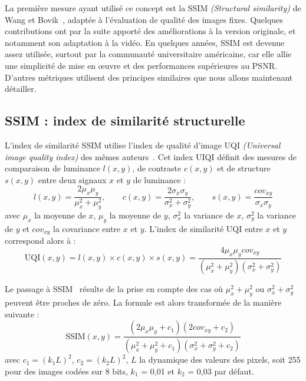 La première mesure ayant utilisé ce concept est la SSIM \emph{(Structural similarity)} de Wang et Bovik~\cite{wang-ssim}, adaptée à l'évaluation de qualité des images fixes. Quelques contributions ont par la suite apporté des améliorations à la version originale, et notamment son adaptation à la vidéo. En quelques années, SSIM est devenue assez utilisée, surtout par la communauté universitaire américaine, car elle allie une simplicité de mise en \oe uvre et des performances supérieures au PSNR. D'autres métriques utilisent des principes similaires que nous allons maintenant détailler.


\subsection{SSIM : index de similarité structurelle} \label{ssec:ssim}
L'index de similarité SSIM utilise l'index de qualité d'image UQI \emph{(Universal image quality index)} des mêmes auteurs~\cite{wang-uiqi}. Cet index UIQI définit des mesures de comparaison de luminance $l(x,y)$, de contraste $c(x,y)$ et de structure $s(x,y)$ entre deux signaux $x$ et $y$ de luminance :
\begin{equation}
l(x,y) = \dfrac{2\mu_x \mu_y}{\mu_x^2 + \mu_y^2} , \qquad c(x,y) = \dfrac{2\sigma_x \sigma_y}{\sigma_x^2 + \sigma_y^2}, \qquad s(x,y) = \dfrac{\mathit{cov}_{xy}}{\sigma_x \sigma_y}
\end{equation}
%
avec $\mu_x$ la moyenne de $x$, $\mu_y$ la moyenne de $y$, $\sigma_x^2$ la variance de $x$, $\sigma_y^2$ la variance de $y$ et $\mathit{cov}_{xy}$ la covariance entre $x$ et $y$. L'index de similarité UQI entre $x$ et $y$ correspond alors à :
\begin{equation}
\text{UQI}(x,y) = l(x,y) \times c(x,y) \times s(x,y) = \dfrac{4\mu_x\mu_y\mathit{cov}_{xy}}{(\mu_x^2+\mu_y^2)(\sigma_x^2 + \sigma_y^2)}
\end{equation}

Le passage à SSIM~\cite{wang-ssim} résulte de la prise en compte des cas où $\mu_x^2+\mu_y^2$ ou $\sigma_x^2 + \sigma_y^2$ peuvent être proches de zéro. La formule est alors transformée de la manière suivante :
\begin{equation}
\text{SSIM}(x,y) = \dfrac{(2\mu_x\mu_y+c_1)(2\mathit{cov}_{xy}+c_2)}{(\mu_x^2+\mu_y^2 + c_1)(\sigma_x^2 + \sigma_y^2 + c_2)}
\end{equation}
%
avec $c_1 = (k_1L)^2$, $c_2 = (k_2L)^2$, $L$ la dynamique des valeurs des pixels, soit 255 pour des images codées sur 8 bits, $k_1$ = 0,01 et $k_2$ = 0,03 par défaut.

